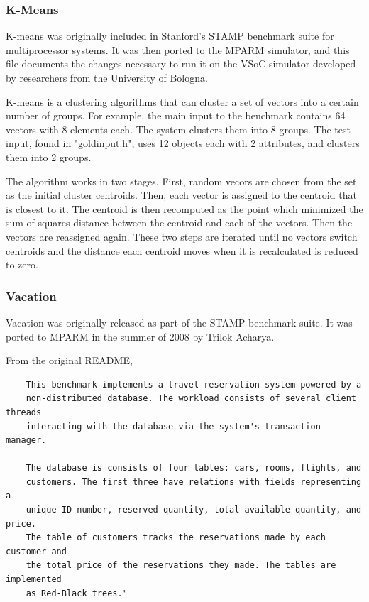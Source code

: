 \documentclass{article}
\begin{document}
\subsubsection{K-Means}

K-means was originally included in Stanford's STAMP benchmark suite for 
multiprocessor systems.  It was then ported to the MPARM simulator, and this
file documents the changes necessary to run it on the VSoC simulator developed
by researchers from the University of Bologna. 

K-means is a clustering algorithms that can cluster a set of vectors into a 
certain number of groups.  For example, the main input to the benchmark
contains 64 vectors with 8 elements each. The system clusters them into 8
groups.  The test input, found in "goldinput.h", uses 12 objects each with 
2 attributes, and clusters them into 2 groups. 

The algorithm works in two stages. First, random vecors are chosen from the
set as the initial cluster centroids. Then, each vector is assigned to the 
centroid that is closest to it. The centroid is then recomputed as the point
which minimized the sum of squares distance between the centroid and each of 
the vectors. Then the vectors are reassigned again. These two steps are
iterated until no vectors switch centroids and the distance each centroid moves
when it is recalculated is reduced to zero. 

\subsubsection{Vacation}

Vacation was originally released as part of the STAMP benchmark suite. It was
ported to MPARM in the summer of 2008 by Trilok Acharya.

From the original README, 

\begin{verbatim}
    This benchmark implements a travel reservation system powered by a
    non-distributed database. The workload consists of several client threads
    interacting with the database via the system's transaction manager.

    The database is consists of four tables: cars, rooms, flights, and 
    customers. The first three have relations with fields representing a 
    unique ID number, reserved quantity, total available quantity, and price. 
    The table of customers tracks the reservations made by each customer and 
    the total price of the reservations they made. The tables are implemented 
    as Red-Black trees."
\end{verbatim}
\end{document}

